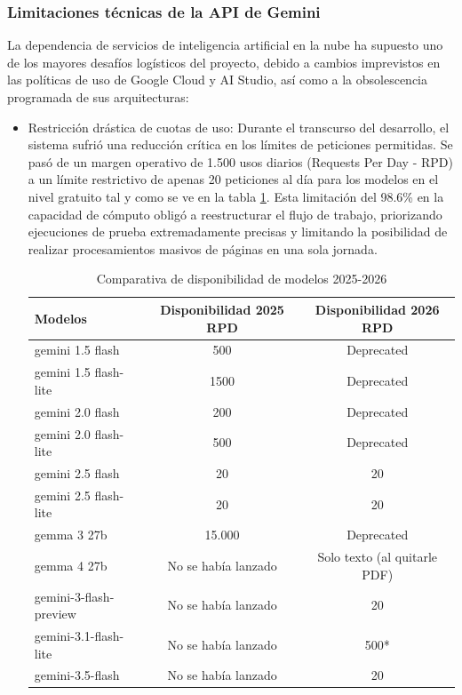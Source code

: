 \subsubsection{Limitaciones técnicas de la API de Gemini}
La dependencia de servicios de inteligencia artificial en la nube ha supuesto uno de los mayores desafíos logísticos del proyecto, debido a cambios imprevistos en las políticas de uso de Google Cloud y AI Studio, así como a la obsolescencia programada de sus arquitecturas:
\begin{itemize}
    \item Restricción drástica de cuotas de uso: Durante el transcurso del desarrollo, el sistema sufrió una reducción crítica en los límites de peticiones permitidas. Se pasó de un margen operativo de 1.500 usos diarios (Requests Per Day - RPD) a un límite restrictivo de apenas 20 peticiones al día para los modelos en el nivel gratuito tal y como se ve en la tabla \ref{tab:modelos_rpd}.
    Esta limitación del 98.6\% en la capacidad de cómputo obligó a reestructurar el flujo de trabajo, priorizando ejecuciones de prueba extremadamente precisas y limitando la posibilidad de realizar procesamientos masivos de páginas en una sola jornada.
    
    \begin{table}[h]
    \centering
    \caption{Comparativa de disponibilidad de modelos 2025-2026}
    \label{tab:modelos_rpd}
    \begin{tabular}{|l|c|c|}
    \hline
    \textbf{Modelos} & \textbf{Disponibilidad 2025 RPD} & \textbf{Disponibilidad 2026 RPD} \\
    \hline
    gemini 1.5 flash & 500 & Deprecated \\
    gemini 1.5 flash-lite & 1500 & Deprecated \\
    gemini 2.0 flash & 200 & Deprecated \\
    gemini 2.0 flash-lite & 500 & Deprecated \\
    gemini 2.5 flash & 20 & 20 \\
    gemini 2.5 flash-lite & 20 & 20 \\
    gemma 3 27b & 15.000 & Deprecated \\
    gemma 4 27b & No se había lanzado & Solo texto (al quitarle PDF) \\
    gemini-3-flash-preview & No se había lanzado & 20 \\
    gemini-3.1-flash-lite & No se había lanzado & 500* \\
    gemini-3.5-flash & No se había lanzado & 20 \\
    \hline
    \end{tabular}
    \end{table}


\end{itemize}

